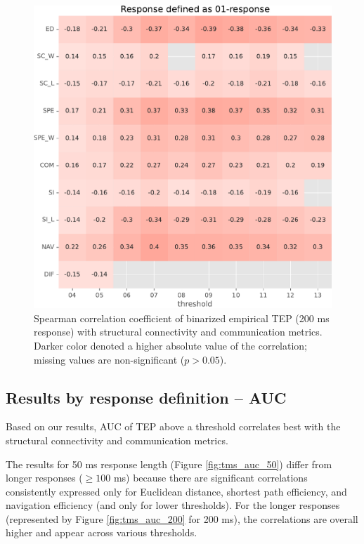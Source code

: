 \begin{figure}
    \centering
    \includegraphics[width=\textwidth]{images/nootebook_generated/pytepfit_results/empirical/200/not_over_threshold_nan/Response defined as 01-response.pdf}
    \caption[Binarized TEP (200 ms) correlations]{Spearman correlation coefficient of binarized empirical TEP (200 ms response) with structural connectivity and communication metrics. Darker color denoted a higher absolute value of the correlation; missing values are non-significant ($p>0.05$).}
    \label{fig:tms_01_200}
\end{figure}

\subsection{Results by response definition -- AUC}

Based on our results, AUC of TEP above a threshold correlates best with the structural connectivity and communication metrics.

The results for 50 ms response length (Figure \ref{fig:tms_auc_50}) differ from longer responses ($\geq100$ ms) because there are significant correlations consistently expressed only for Euclidean distance, shortest path efficiency, and navigation efficiency (and only for lower thresholds). For the longer responses (represented by Figure \ref{fig:tms_auc_200} for 200 ms), the correlations are overall higher and appear across various thresholds. 

